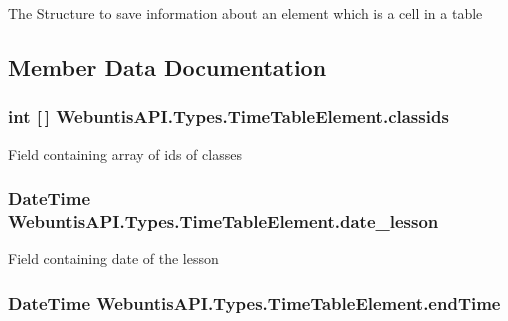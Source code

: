 The Structure to save information about an element which is a cell in a table 

\subsection{Member Data Documentation}
\hypertarget{struct_webuntis_a_p_i_1_1_types_1_1_time_table_element_ab3f7530ba709811a0f080b9f25ee3b76}{
\subsubsection[{classids}]{\setlength{\rightskip}{0pt plus 5cm}int \mbox{[}$\,$\mbox{]} Webuntis\-A\-P\-I.\-Types.\-Time\-Table\-Element.\-classids}}\label{struct_webuntis_a_p_i_1_1_types_1_1_time_table_element_ab3f7530ba709811a0f080b9f25ee3b76}
Field containing array of ids of classes \hypertarget{struct_webuntis_a_p_i_1_1_types_1_1_time_table_element_a2ce093cea22aa8960523959541d15d02}{
\subsubsection[{date\-\_\-lesson}]{\setlength{\rightskip}{0pt plus 5cm}Date\-Time Webuntis\-A\-P\-I.\-Types.\-Time\-Table\-Element.\-date\-\_\-lesson}}\label{struct_webuntis_a_p_i_1_1_types_1_1_time_table_element_a2ce093cea22aa8960523959541d15d02}
Field containing date of the lesson \hypertarget{struct_webuntis_a_p_i_1_1_types_1_1_time_table_element_a0ef904dd3308b39f0ef4af265e428544}{
\subsubsection[{end\-Time}]{\setlength{\rightskip}{0pt plus 5cm}Date\-Time Webuntis\-A\-P\-I.\-Types.\-Time\-Table\-Element.\-end\-Time}}\label{struct_webuntis_a_p_i_1_1_types_1_1_time_table_element_a0ef904dd3308b39f0ef4af265e428544}
